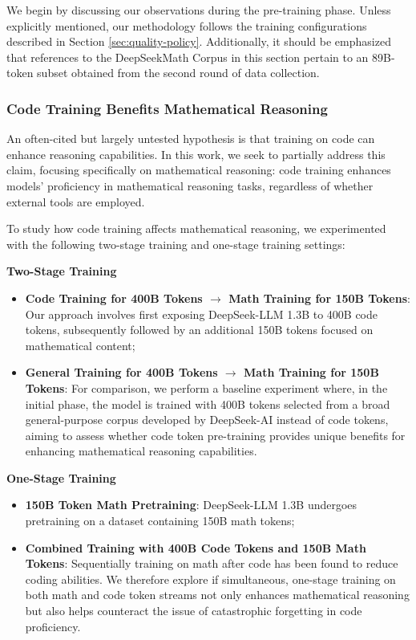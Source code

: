 \begin{itemize}[topsep=0pt]
We begin by discussing our observations during the pre-training phase. Unless explicitly mentioned, our methodology follows the training configurations described in Section \ref{sec:quality-policy}. Additionally, it should be emphasized that references to the DeepSeekMath Corpus in this section pertain to an 89B-token subset obtained from the second round of data collection.

\subsubsection{Code Training Benefits Mathematical Reasoning}

An often-cited but largely untested hypothesis is that training on code can enhance reasoning capabilities. In this work, we seek to partially address this claim, focusing specifically on mathematical reasoning: code training enhances models' proficiency in mathematical reasoning tasks, regardless of whether external tools are employed.

To study how code training affects mathematical reasoning, we experimented with the following two-stage training and one-stage training settings:

\textbf{Two-Stage Training}

\begin{itemize}[topsep=0pt]
    \item \textbf{Code Training for 400B Tokens $\rightarrow$ Math Training for 150B Tokens}: Our approach involves first exposing DeepSeek-LLM 1.3B to 400B code tokens, subsequently followed by an additional 150B tokens focused on mathematical content;
    \item \textbf{General Training for 400B Tokens $\rightarrow$ Math Training for 150B Tokens}: For comparison, we perform a baseline experiment where, in the initial phase, the model is trained with 400B tokens selected from a broad general-purpose corpus developed by DeepSeek-AI instead of code tokens, aiming to assess whether code token pre-training provides unique benefits for enhancing mathematical reasoning capabilities.
\end{itemize}

\textbf{One-Stage Training}

\begin{itemize}[topsep=0pt]
    \item \textbf{150B Token Math Pretraining}: DeepSeek-LLM 1.3B undergoes pretraining on a dataset containing 150B math tokens;
    \item \textbf{Combined Training with 400B Code Tokens and 150B Math Tokens}: Sequentially training on math after code has been found to reduce coding abilities. We therefore explore if simultaneous, one-stage training on both math and code token streams not only enhances mathematical reasoning but also helps counteract the issue of catastrophic forgetting in code proficiency.
\end{itemize}


\end{itemize}
